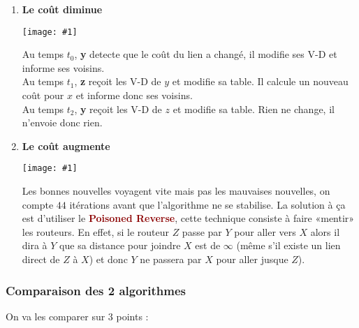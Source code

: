 \documentclass{article}
\newcommand{\dred}[1]{\textcolor{darkred}{\textbf{#1}}}
\newcommand{\ora}[1]{\textcolor{darko}{#1}}
\newcommand{\red}[1]{\textcolor{darkred}{#1}}
\newcommand{\imgR}[2]{\begin{center}\texttt{[image: \#1]}\end{center}}
\newcommand{\point}[2]{\item \ora{\underline{#1}} : \textit{#2}}
\newcommand{\bfp}[2]{\item \textbf{#1} : \textit{#2}}
\begin{document}
\begin{enumerate}
\item \textbf{Le coût diminue}
\imgR{CN_089.png}{100}
Au temps $t_0$, \textbf{y} detecte que le coût du lien a changé, il modifie ses V-D et informe ses voisins.\\
Au temps $t_1$, \textbf{z} reçoit les V-D de $y$ et modifie sa table. Il calcule un nouveau coût pour $x$ et 
informe donc ses voisins. \\
Au temps $t_2$, \textbf{y} reçoit les V-D de $z$ et modifie sa table. Rien ne change, il n'envoie donc rien.
\item \textbf{Le coût augmente}
\imgR{CN_090.png}{100}
Les bonnes nouvelles voyagent vite mais pas les mauvaises nouvelles, on compte $44$ itérations avant que 
l'algorithme ne se stabilise. La solution à ça est d'utiliser le \dred{Poisoned Reverse}, cette technique consiste
à faire «mentir» les routeurs. En effet, si le routeur $Z$ passe par $Y$ pour aller vers $X$ alors il dira à $Y$
que sa distance pour joindre $X$ est de $\infty$ (même s'il existe un lien direct de $Z$ à $X$) et donc $Y$ ne 
passera par $X$ pour aller jusque $Z$).
\end{enumerate}

\subsubsection{Comparaison des 2 algorithmes}

On va les comparer sur 3 points : 
\end{document}
